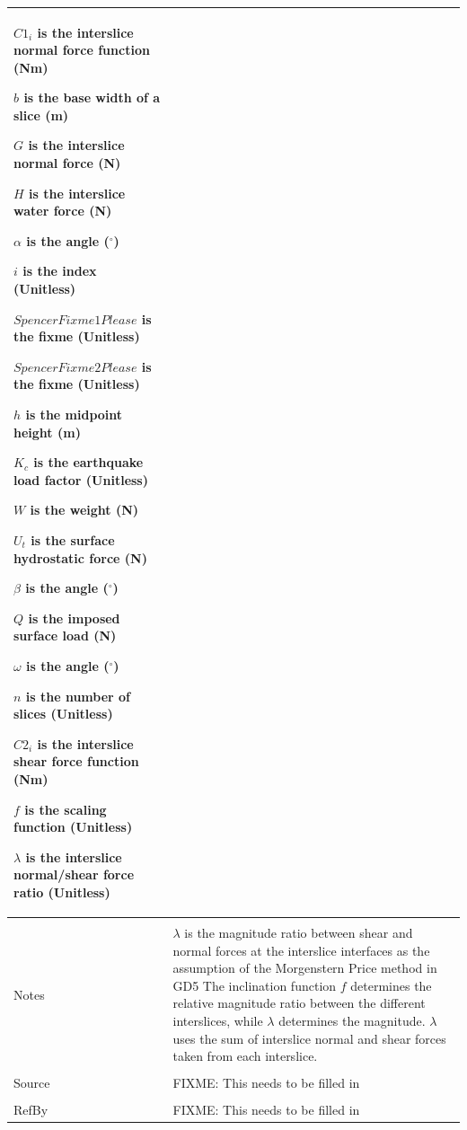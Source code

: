 \documentclass[12pt]{article}
\begin{document}
\begin{minipage}{\textwidth}
\begin{tabular}{p{} p{}}
\begin{symbDescription}
              \item{${C1_{i}}$ is the interslice normal force function (Nm)}
              \item{$b$ is the base width of a slice (m)}
              \item{$G$ is the interslice normal force (N)}
              \item{$H$ is the interslice water force (N)}
              \item{$α$ is the angle (${}^{\circ}$)}
              \item{$i$ is the index (Unitless)}
              \item{$SpencerFixme1Please$ is the fixme (Unitless)}
              \item{$SpencerFixme2Please$ is the fixme (Unitless)}
              \item{$h$ is the midpoint height (m)}
              \item{${K_{c}}$ is the earthquake load factor (Unitless)}
              \item{$W$ is the weight (N)}
              \item{${U_{t}}$ is the surface hydrostatic force (N)}
              \item{$β$ is the angle (${}^{\circ}$)}
              \item{$Q$ is the imposed surface load (N)}
              \item{$ω$ is the angle (${}^{\circ}$)}
              \item{$n$ is the number of slices (Unitless)}
              \item{${C2_{i}}$ is the interslice shear force function (Nm)}
              \item{$f$ is the scaling function (Unitless)}
              \item{$λ$ is the interslice normal/shear force ratio (Unitless)}
              \end{symbDescription}
\\ \midrule \\
Notes & $λ$ is the magnitude ratio between shear and normal forces at the interslice interfaces as the assumption of the Morgenstern Price method in GD5 The inclination function $f$ determines the relative magnitude ratio between the different interslices, while $λ$ determines the magnitude. $λ$ uses the sum of interslice normal and shear forces taken from each interslice.
\\ \midrule \\
Source & FIXME: This needs to be filled in
\\ \midrule \\
RefBy & FIXME: This needs to be filled in
\\ \bottomrule \end{tabular}
\end{minipage}\\
\end{document}
